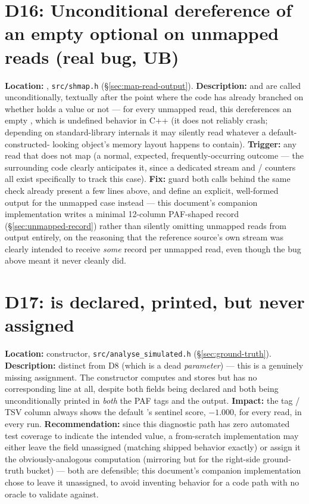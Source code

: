\section{D16: Unconditional dereference of an empty optional on unmapped reads (real bug, UB)}
\label{sec:d16}
\textbf{Location:} , \texttt{src/shmap.h} (\S\ref{sec:map-read-output}).
\textbf{Description:}  and  are
called unconditionally, textually after the point where the code has already branched on whether
 holds a value or not --- for every unmapped read, this dereferences an empty
, which is undefined behavior in C++ (it does not reliably crash;
depending on standard-library internals it may silently read whatever a default-constructed-
looking object's memory layout happens to contain). \textbf{Trigger:} any read that does not map
(a normal, expected, frequently-occurring outcome --- the surrounding code clearly anticipates it,
since a dedicated  stream and /
counters all exist specifically to track this case). \textbf{Fix:} guard both calls behind the
same  check already present a few lines above, and define an explicit,
well-formed output for the unmapped case instead --- this document's companion implementation
writes a minimal 12-column PAF-shaped record (\S\ref{sec:unmapped-record}) rather than silently
omitting unmapped reads from output entirely, on the reasoning that the reference source's own
 stream was clearly intended to receive \emph{some} record per unmapped read,
even though the bug above meant it never cleanly did.

\section{D17:  is declared, printed, but never assigned}
\label{sec:d17}
\textbf{Location:}  constructor, \texttt{src/analyse\_simulated.h}
(\S\ref{sec:ground-truth}). \textbf{Description:} distinct from D8 (which is a dead
\emph{parameter}) --- this is a genuinely missing assignment. The constructor computes and stores
 but has no corresponding  line at all, despite
both fields being declared and both being unconditionally printed in \emph{both} the 
PAF tags and the  output. \textbf{Impact:} the  tag / TSV
column always shows the default 's sentinel score, $-1.000$, for every read, in
every run. \textbf{Recommendation:} since this diagnostic path has zero automated test coverage
to indicate the intended value, a from-scratch implementation may either leave the field
unassigned (matching shipped behavior exactly) or assign it the obviously-analogous computation
(mirroring  but for the right-side ground-truth bucket) --- both are
defensible; this document's companion implementation chose to leave it unassigned, to avoid
inventing behavior for a code path with no oracle to validate against.

